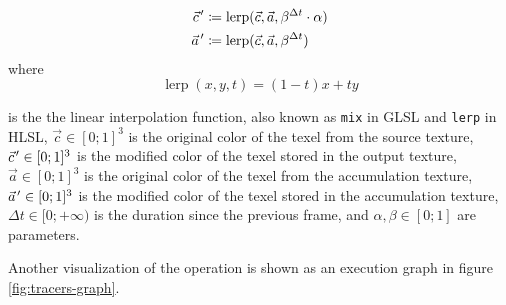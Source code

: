 \begin{align}
    \pvec{c}' &\coloneqq \operatorname{lerp}(\vec{c}, \vec{a}, \beta^{\Delta t} \cdot \alpha) \\
    \pvec{a}' &\coloneqq \operatorname{lerp}(\vec{c}, \vec{a}, \beta^{\Delta t})
\end{align}
where
\begin{equation}
    \operatorname{lerp}(x, y, t) = (1 - t)x + ty
\end{equation}

is the the linear interpolation function, also known as \texttt{mix} in \ac{GLSL} and \texttt{lerp} in \ac{HLSL}, $\vec{c} \in [0; 1]^3$ is the original color of the texel from the source texture, $\pvec{c}' \in [0; 1]^3$ is the modified color of the texel stored in the output texture, $\vec{a} \in [0; 1]^3$ is the original color of the texel from the accumulation texture, $\pvec{a}' \in [0; 1]^3$ is the modified color of the texel stored in the accumulation texture, $\Delta t \in [0; +\infty)$ is the duration since the previous frame, and $\alpha, \beta \in [0; 1]$ are parameters.

Another visualization of the operation is shown as an execution graph in figure \ref{fig:tracers-graph}.

